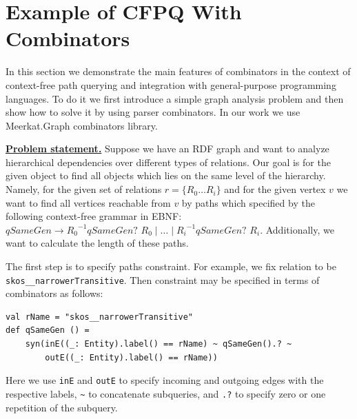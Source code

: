 \section{Example of CFPQ With Combinators}\label{sect:combinators}

In this section we demonstrate the main features of combinators in the context of context-free path querying and integration with general-purpose programming languages.
To do it we first introduce a simple graph analysis problem and then show how to solve it by using parser combinators.
In our work we use Meerkat.Graph combinators library.

\underline{\textbf{Problem statement.}}
Suppose we have an RDF graph and want to analyze hierarchical dependencies over different types of relations.
Our goal is for the given object to find all objects which lies on the same level of the hierarchy.
Namely, for the given set of relations $r = \{R_0 \ldots R_i\}$ and for the given vertex $v$ we want to find all vertices reachable from $v$ by paths which specified by the following context-free grammar in EBNF: 
 $\textit{qSameGen} \to {R_0}^{-1} \textit{qSameGen? } R_0 \mid \ldots \mid {R_i}^{-1} \textit{qSameGen? } R_i.$
Additionally, we want to calculate the length of these paths.


The first step is to specify paths constraint. 
For example, we fix relation to be \verb|skos__narrowerTransitive|.
Then constraint may be specified in terms of combinators as follows:

\begin{lstlisting}
val rName = "skos__narrowerTransitive"
def qSameGen () =
    syn(inE((_: Entity).label() == rName) ~ qSameGen().? ~
        outE((_: Entity).label() == rName))
\end{lstlisting}

Here we use \verb|inE| and \verb|outE| to specify incoming and outgoing edges with the respective labels, \verb|~| to concatenate subqueries, and \verb|.?| to specify zero or one repetition of the subquery.

